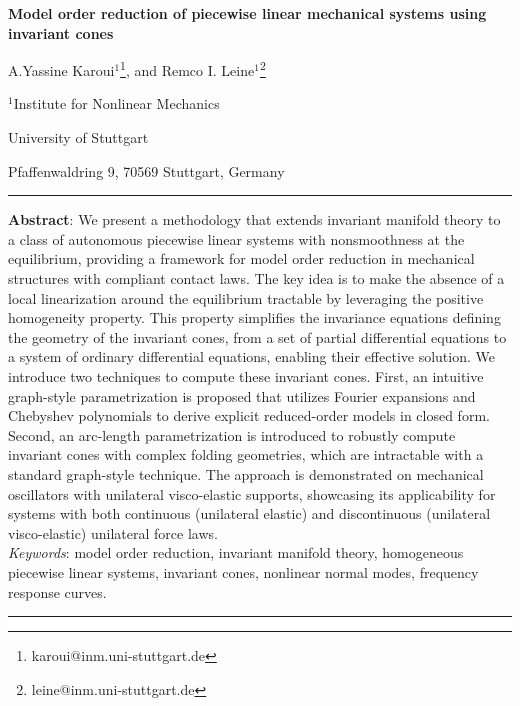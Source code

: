 \documentclass[a4paper,9pt,parskip=half,english]{article}
\theoremstyle{plain}
\theoremstyle{definition}
\begin{document}
	\begin{center}
		\textbf{\large Model order reduction of piecewise linear mechanical systems using invariant cones }
		
		\qquad

		\renewcommand{\thefootnote}{\fnsymbol{footnote}}
		A.Yassine Karoui$^{1}$\footnote{karoui@inm.uni-stuttgart.de},
		and
		Remco I. Leine$^{1}$\footnote{leine@inm.uni-stuttgart.de}
		
		\qquad
		
		$^{1}$Institute for Nonlinear Mechanics
		
		University of Stuttgart
		
		Pfaffenwaldring 9, 70569 Stuttgart, Germany
		
		
	\end{center}
	\vspace{5pt}
	\hrule
	\vspace{8pt}
	\textbf{Abstract}: 
	We present a methodology that extends invariant manifold theory to a class of autonomous piecewise linear systems with nonsmoothness at the equilibrium, providing a framework for model order reduction in mechanical structures with compliant contact laws. The key idea is to make the absence of a local linearization around the equilibrium tractable by leveraging the positive homogeneity property. This property simplifies the invariance equations defining the geometry of the invariant cones, from a set of partial differential equations to a system of ordinary differential equations, enabling their effective solution. We introduce two techniques to compute these invariant cones. First, an intuitive graph-style parametrization is proposed that utilizes Fourier expansions and Chebyshev polynomials to derive explicit reduced-order models in closed form. Second, an arc-length parametrization is introduced to robustly compute invariant cones with complex folding geometries, which are intractable with a standard graph-style technique. The approach is demonstrated on mechanical oscillators with unilateral visco-elastic supports, showcasing its applicability for systems with both continuous (unilateral elastic) and discontinuous (unilateral visco-elastic) unilateral force laws. \\[8pt]
	\textit{Keywords}: model order reduction, invariant manifold theory, homogeneous piecewise linear systems, invariant cones, nonlinear normal modes, frequency response curves.  
	\vspace{8pt}
	\hrule
\setcounter{footnote}{0}
\renewcommand{\thefootnote}{\roman{footnote}}
\end{document}
